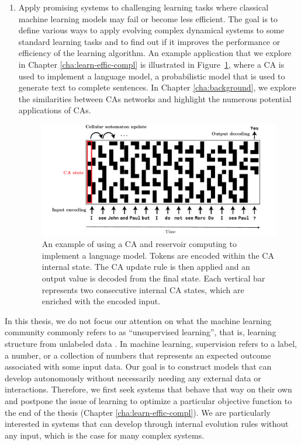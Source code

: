 \begin{enumerate}
  \item Apply promising systems to challenging learning tasks where classical
        machine learning models may fail or become less efficient. The goal is to
        define various ways to apply evolving complex dynamical systems to some
        standard learning tasks and to find out if it improves the performance
        or efficiency of the learning algorithm. An example application that we
        explore in Chapter \ref{cha:learn-effic-compl} is illustrated in
        Figure~\ref{fig:ca_lm}, where a \ac{CA} is used to implement a language
        model, a probabilistic model that is used to generate text to complete
        sentences. In Chapter \ref{cha:background}, we explore the similarities
        between \acp{CA} networks and highlight the numerous potential applications of CAs.
\begin{figure}[htbp]
  \centering
  \includegraphics[width=\linewidth]{figures/ca_lm}
  \caption{An example of using a \acl{CA} and reservoir computing to implement a
    language model. Tokens are encoded within the \acl{CA} internal state. The
    \acl{CA} update rule is then applied and an output value is decoded from the
    final state. Each vertical bar represents two consecutive internal \ac{CA} states, which 
    are enriched with the encoded input.}
  \label{fig:ca_lm}
\end{figure}

\end{enumerate}

In this thesis, we do not focus our attention on what the machine learning
community commonly refers to as ``unsupervised learning'', that is, learning
structure from unlabeled data
\parencite{hintonUnsupervisedLearningFoundations1999}. In machine learning,
supervision refers to a label, a number, or a collection of numbers that
represents an expected outcome associated with some input data. Our goal is to
construct models that can develop autonomously without necessarily needing any external data or
interactions. Therefore, we first seek systems that behave that way on their
own and postpone the issue of learning to optimize a particular objective
function to the end of the thesis (Chapter \ref{cha:learn-effic-compl}). 
We are particularly interested in systems that can develop through
internal evolution rules without any input, which is the case for many complex
systems.

